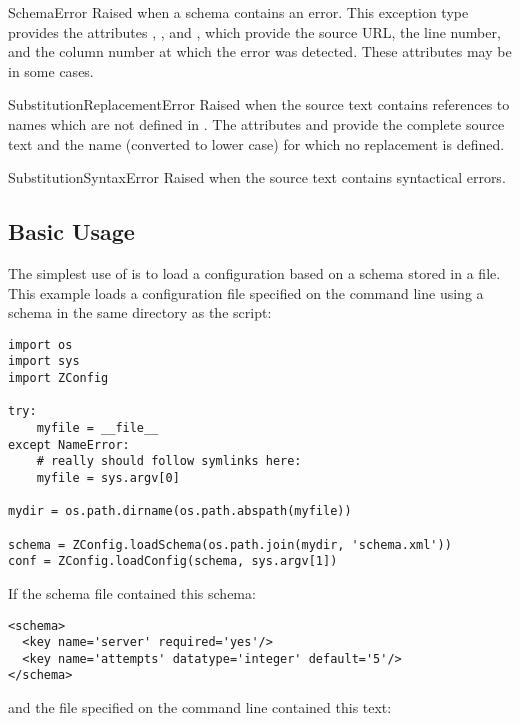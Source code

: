 \documentclass{howto}
\begin{document}
\begin{excdesc}{SchemaError}
  Raised when a schema contains an error.  This exception type
  provides the attributes , , and
  , which provide the source URL, the line number, and
  the column number at which the error was detected.  These attributes
  may be  in some cases.
\end{excdesc}

\begin{excdesc}{SubstitutionReplacementError}
  Raised when the source text contains references to names which are
  not defined in .  The attributes  and
   provide the complete source text and the name
  (converted to lower case) for which no replacement is defined.
\end{excdesc}

\begin{excdesc}{SubstitutionSyntaxError}
  Raised when the source text contains syntactical errors.
\end{excdesc}


\subsection{Basic Usage}

The simplest use of  is to load a configuration
based on a schema stored in a file.  This example loads a
configuration file specified on the command line using a schema in the
same directory as the script:

\begin{verbatim}
import os
import sys
import ZConfig

try:
    myfile = __file__
except NameError:
    # really should follow symlinks here:
    myfile = sys.argv[0]

mydir = os.path.dirname(os.path.abspath(myfile))

schema = ZConfig.loadSchema(os.path.join(mydir, 'schema.xml'))
conf = ZConfig.loadConfig(schema, sys.argv[1])
\end{verbatim}

If the schema file contained this schema:

\begin{verbatim}
<schema>
  <key name='server' required='yes'/>
  <key name='attempts' datatype='integer' default='5'/>
</schema>
\end{verbatim}

and the file specified on the command line contained this text:
\end{document}
